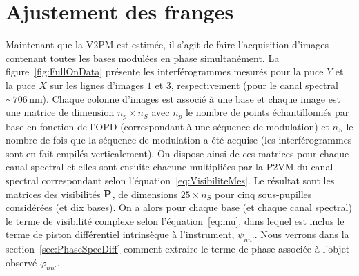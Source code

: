 

\section{Ajustement des franges}
\label{sec:FullOnFit}

Maintenant que la \ac{V2PM} est estimée, il s'agit de faire l'acquisition d'images contenant toutes les bases modulées en phase simultanément. La figure~\ref{fig:FullOnData} présente les interférogrammes mesurés pour la puce $Y$ et la puce $X$ sur les lignes d'images $1$ et $3$, respectivement (pour le canal spectral $\sim 706 \,$nm). Chaque colonne d'images est associé à une base et chaque image est une matrice de dimension $n_p \times n_S$ avec $n_p$ le nombre de points échantillonnés par base en fonction de l'\ac{OPD} (correspondant à une séquence de modulation) et $n_S$ le nombre de fois que la séquence de modulation a été acquise (les interférogrammes sont en fait empilés verticalement). On dispose ainsi de ces matrices pour chaque canal spectral et elles sont ensuite chacune multipliées par la \ac{P2VM} du canal spectral correspondant selon l'équation~\ref{eq:VisibiliteMes}. Le résultat sont les matrices des visibilités $\text{\textbf{P}}$, de dimensions $25 \times n_S$ pour cinq sous-pupilles considérées (et dix bases). On a alors pour chaque base (et chaque canal spectral) le terme de visibilité complexe selon l'équation~\ref{eq:mu}, dans lequel est inclus le terme de piston différentiel intrinsèque à l'instrument, $\psi_{nn'}$. Nous verrons dans la section~\ref{sec:PhaseSpecDiff} comment extraire le terme de phase associée à l'objet observé $\varphi_{nn'}$.

